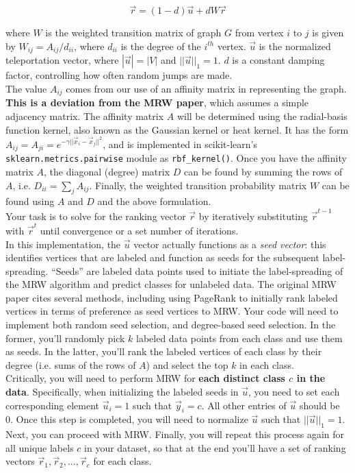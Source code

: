 \documentclass[paper=a4, fontsize=11pt]{scrartcl} %
\numberwithin{figure}{section} %
\numberwithin{table}{section} %
\begin{document}
$$
\vec{r} = (1 - d)\vec{u} + dW\vec{r}
$$

where $W$ is the weighted transition matrix of graph $G$ from vertex $i$ to $j$ is given by $W_{ij} = A_{ij} /d_{ii}$, where $d_{ii}$ is the degree of the $i^{th}$ vertex. $\vec{u}$ is the normalized teleportation vector, where $|\vec{u}| = |V|$ and $||\vec{u}||_1 = 1$. $d$ is a constant damping factor, controlling how often random jumps are made. \\

The value $A_{ij}$ comes from our use of an affinity matrix in representing the graph. \textbf{This is a deviation from the MRW paper}, which assumes a simple adjacency matrix. The affinity matrix $A$ will be determined using the radial-basis function kernel, also known as the Gaussian kernel or heat kernel. It has the form $A_{ij} = A_{ji} = e^{-\gamma ||\vec{x}_i - \vec{x}_j||^2}$, and is implemented in scikit-learn's \texttt{sklearn.metrics.pairwise} module as \texttt{rbf\_kernel()}. Once you have the affinity matrix $A$, the diagonal (degree) matrix $D$ can be found by summing the rows of $A$, i.e. $D_{ii} = \sum_j A_{ij}$. Finally, the weighted transition probability matrix $W$ can be found using $A$ and $D$ and the above formulation. \\

Your task is to solve for the ranking vector $\vec{r}$ by iteratively substituting $\vec{r}^{t - 1}$ with $\vec{r}^t$ until convergence or a set number of iterations. \\

In this implementation, the $\vec{u}$ vector actually functions as a \emph{seed vector}: this identifies vertices that are labeled and function as seeds for the subsequent label-spreading. ``Seeds'' are labeled data points used to initiate the label-spreading of the MRW algorithm and predict classes for unlabeled data. The original MRW paper cites several methods, including using PageRank to initially rank labeled vertices in terms of preference as seed vertices to MRW. Your code will need to implement both random seed selection, and degree-based seed selection. In the former, you'll randomly pick $k$ labeled data points from each class and use them as seeds. In the latter, you'll rank the labeled vertices of each class by their degree (i.e. sums of the rows of $A$) and select the top $k$ in each class. \\

Critically, you will need to perform MRW for \textbf{each distinct class $c$ in the data}. Specifically, when initializing the labeled seeds in $\vec{u}$, you need to set each corresponding element $\vec{u}_i = 1$ such that $\vec{y}_i = c$. All other entries of $\vec{u}$ should be 0. Once this step is completed, you will need to normalize $\vec{u}$ such that $||\vec{u}||_1 = 1$. Next, you can proceed with MRW. Finally, you will repeat this process again for all unique labels $c$ in your dataset, so that at the end you'll have a set of ranking vectors $\vec{r}_1, \vec{r}_2, ..., \vec{r}_c$ for each class. \\
\end{document}
